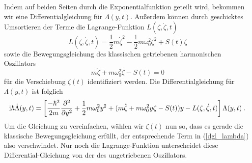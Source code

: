 
  Indem auf beiden Seiten durch die Exponentialfunktion geteilt wird, bekommen wir eine Differentialgleichung für $\Lambda(y,t)$.
  Außerdem können durch geschicktes Umsortieren der Terme die Lagrange-Funktion $L(\zeta,\dot \zeta, t)$
  \begin{equation}
    L(\zeta,\dot \zeta, t) = \frac{1}{2}m\dot \zeta^2 - \frac{1}{2}m\omega_0^2\zeta^2 + S(t)\zeta
    \label{lagrange_zeta}
  \end{equation}
    sowie die Bewegungsgleichung des klassischen getriebenen harmonischen  Oszillators \cite{husimi}
    \begin{equation}
      m\ddot \zeta + m\omega_0^2\zeta - S(t) = 0
      \label{dgl_zeta}
    \end{equation}
  für die Verschiebung $\zeta(t)$ identifiziert werden.
  Die Differentialgleichung für $\Lambda(y,t)$ ist folglich
  \begin{equation}
    \text i \hbar \dot \Lambda(y,t) = \left[ \frac{-\hbar^2}{2m}\frac{\partial^2}{\partial y^2} + \frac{1}{2}m\omega_0^2y^2 + (m\ddot \zeta + m\omega_0^2y\zeta - S(t))y - L(\zeta,\dot \zeta, t) \right]\Lambda(y,t) \; .
    \label{dgl_lambda}
  \end{equation}
  Um die Gleichung zu vereinfachen, wählen wir $\zeta(t)$ nun so, dass es gerade die klassische Bewegungsgleichung erfüllt, der entsprechende Term in (\ref{dgl_lambda}) also verschwindet.
  Nur noch die Lagrange-Funktion unterscheidet diese Differential-Gleichung von der des ungetriebenen Oszillators.

